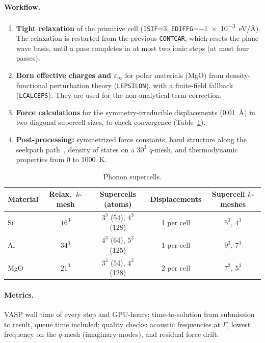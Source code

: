 \documentclass[11pt,letterpaper]{article}
\begin{document}
\paragraph{Workflow.}
\begin{enumerate}
  \item \textbf{Tight relaxation} of the primitive cell (\texttt{ISIF}=3,
        \texttt{EDIFFG}=\SI{-1e-3}{eV/\angstrom}). The relaxation is restarted from the
        previous \texttt{CONTCAR}, which resets the plane-wave basis, until a pass completes in
        at most two ionic steps (at most four passes).
  \item \textbf{Born effective charges and $\varepsilon_\infty$} for polar materials (MgO) from
        density-functional perturbation theory (\texttt{LEPSILON}), with a finite-field
        fallback (\texttt{LCALCEPS}). They are used for the non-analytical term correction.
  \item \textbf{Force calculations} for the symmetry-irreducible displacements
        (\SI{0.01}{\angstrom}) in two diagonal supercell sizes, to check convergence
        (Table~\ref{tab:phonon-cells}).
  \item \textbf{Post-processing:} symmetrized force constants, band structure along the
        seekpath path~\cite{Hinuma2017}, density of states on a $30^3$ $q$-mesh, and
        thermodynamic properties from 0 to \SI{1000}{K}.
\end{enumerate}

\begin{table}[htbp]
\centering
\caption{Phonon supercells.}
\label{tab:phonon-cells}
\small
\begin{tabular}{@{}lcccc@{}}
\toprule
Material & Relax.\ $k$-mesh & Supercells (atoms) & Displacements & Supercell $k$-meshes \\
\midrule
Si & $16^3$ & $3^3$ (54), $4^3$ (128) & 1 per cell & $5^3$, $4^3$ \\
Al & $34^3$ & $4^3$ (64), $5^3$ (125) & 1 per cell & $9^3$, $7^3$ \\
MgO & $21^3$ & $3^3$ (54), $4^3$ (128) & 2 per cell & $7^3$, $5^3$ \\
\bottomrule
\end{tabular}
\end{table}

\paragraph{Metrics.} VASP wall time of every step and GPU-hours; time-to-solution from
submission to result, queue time included; quality checks: acoustic frequencies at $\Gamma$,
lowest frequency on the $q$-mesh (imaginary modes), and residual force drift.
\end{document}
